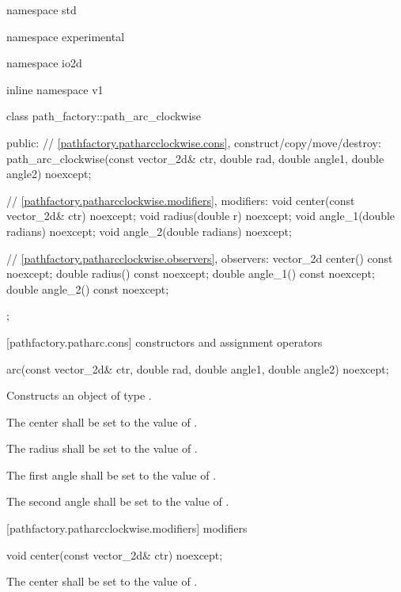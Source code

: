 \begin{codeblock}
namespace std { namespace experimental { namespace io2d { inline namespace v1 {
  class path_factory::path_arc_clockwise {
  public:
    // \ref{pathfactory.patharcclockwise.cons}, construct/copy/move/destroy:
    path_arc_clockwise(const vector_2d& ctr, double rad, double angle1, double angle2) noexcept;

    // \ref{pathfactory.patharcclockwise.modifiers}, modifiers:
    void center(const vector_2d& ctr) noexcept;
    void radius(double r) noexcept;
    void angle_1(double radians) noexcept;
    void angle_2(double radians) noexcept;

    // \ref{pathfactory.patharcclockwise.observers}, observers:
    vector_2d center() const noexcept;
    double radius() const noexcept;
    double angle_1() const noexcept;
    double angle_2() const noexcept;
  };
} } } }
\end{codeblock}

 [pathfactory.patharc.cons] { constructors and assignment operators}

\begin{itemdecl}
    arc(const vector_2d& ctr, double rad, double angle1, double angle2) noexcept;
\end{itemdecl}
\begin{itemdescr}
	\pnum
	\effects
	Constructs an object of type .
	
	\pnum
	The center shall be set to the value of .
	
	\pnum
	The radius shall be set to the value of .
	
	\pnum
	The first angle shall be set to the value of .
	
	\pnum
	The second angle shall be set to the value of .
\end{itemdescr}

 [pathfactory.patharcclockwise.modifiers]{ modifiers}

\begin{itemdecl}
    void center(const vector_2d& ctr) noexcept;
\end{itemdecl}
\begin{itemdescr}
	\pnum
	\effects
	The center shall be set to the value of .
\end{itemdescr}

